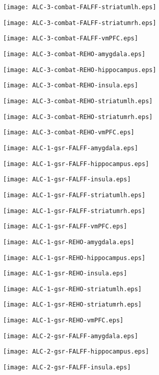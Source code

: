 \documentclass{article}
\begin{document}

\newpage
\texttt{[image: ALC-3-combat-FALFF-striatumlh.eps]}

\newpage
\texttt{[image: ALC-3-combat-FALFF-striatumrh.eps]}

\newpage
\texttt{[image: ALC-3-combat-FALFF-vmPFC.eps]}

\newpage
\texttt{[image: ALC-3-combat-REHO-amygdala.eps]}

\newpage
\texttt{[image: ALC-3-combat-REHO-hippocampus.eps]}

\newpage
\texttt{[image: ALC-3-combat-REHO-insula.eps]}

\newpage
\texttt{[image: ALC-3-combat-REHO-striatumlh.eps]}

\newpage
\texttt{[image: ALC-3-combat-REHO-striatumrh.eps]}

\newpage
\texttt{[image: ALC-3-combat-REHO-vmPFC.eps]}

\newpage
\texttt{[image: ALC-1-gsr-FALFF-amygdala.eps]}

\newpage
\texttt{[image: ALC-1-gsr-FALFF-hippocampus.eps]}

\newpage
\texttt{[image: ALC-1-gsr-FALFF-insula.eps]}

\newpage
\texttt{[image: ALC-1-gsr-FALFF-striatumlh.eps]}

\newpage
\texttt{[image: ALC-1-gsr-FALFF-striatumrh.eps]}

\newpage
\texttt{[image: ALC-1-gsr-FALFF-vmPFC.eps]}

\newpage
\texttt{[image: ALC-1-gsr-REHO-amygdala.eps]}

\newpage
\texttt{[image: ALC-1-gsr-REHO-hippocampus.eps]}

\newpage
\texttt{[image: ALC-1-gsr-REHO-insula.eps]}

\newpage
\texttt{[image: ALC-1-gsr-REHO-striatumlh.eps]}

\newpage
\texttt{[image: ALC-1-gsr-REHO-striatumrh.eps]}

\newpage
\texttt{[image: ALC-1-gsr-REHO-vmPFC.eps]}

\newpage
\texttt{[image: ALC-2-gsr-FALFF-amygdala.eps]}

\newpage
\texttt{[image: ALC-2-gsr-FALFF-hippocampus.eps]}

\newpage
\texttt{[image: ALC-2-gsr-FALFF-insula.eps]}

\end{document}
